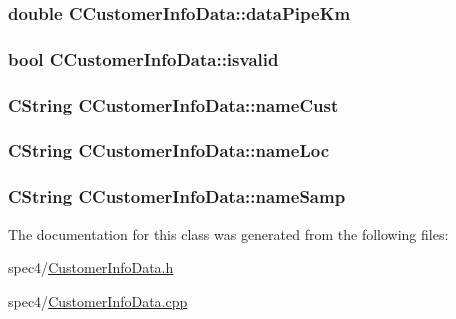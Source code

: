 \label{classCCustomerInfoData_a71c5c553315fdde41f961a83a5503cdc}
\hypertarget{classCCustomerInfoData_afdae97342e110dc8d7fd4ba906692d71}{
\subsubsection[{dataPipeKm}]{\setlength{\rightskip}{0pt plus 5cm}double {\bf CCustomerInfoData::dataPipeKm}}}
\label{classCCustomerInfoData_afdae97342e110dc8d7fd4ba906692d71}
\hypertarget{classCCustomerInfoData_ac67f5590832bae201ffd0f14c86357e9}{
\subsubsection[{isvalid}]{\setlength{\rightskip}{0pt plus 5cm}bool {\bf CCustomerInfoData::isvalid}}}
\label{classCCustomerInfoData_ac67f5590832bae201ffd0f14c86357e9}
\hypertarget{classCCustomerInfoData_ad389acb7e9b5714d258ffe1211cbeee9}{
\subsubsection[{nameCust}]{\setlength{\rightskip}{0pt plus 5cm}CString {\bf CCustomerInfoData::nameCust}}}
\label{classCCustomerInfoData_ad389acb7e9b5714d258ffe1211cbeee9}
\hypertarget{classCCustomerInfoData_aa91d2e5c7291f408f465f5161ef24b73}{
\subsubsection[{nameLoc}]{\setlength{\rightskip}{0pt plus 5cm}CString {\bf CCustomerInfoData::nameLoc}}}
\label{classCCustomerInfoData_aa91d2e5c7291f408f465f5161ef24b73}
\hypertarget{classCCustomerInfoData_a7163a983b6e3c632dd80159577f6d1a3}{
\subsubsection[{nameSamp}]{\setlength{\rightskip}{0pt plus 5cm}CString {\bf CCustomerInfoData::nameSamp}}}
\label{classCCustomerInfoData_a7163a983b6e3c632dd80159577f6d1a3}


The documentation for this class was generated from the following files:\begin{DoxyCompactItemize}
\item 
spec4/\hyperlink{CustomerInfoData_8h}{CustomerInfoData.h}\item 
spec4/\hyperlink{CustomerInfoData_8cpp}{CustomerInfoData.cpp}\end{DoxyCompactItemize}
